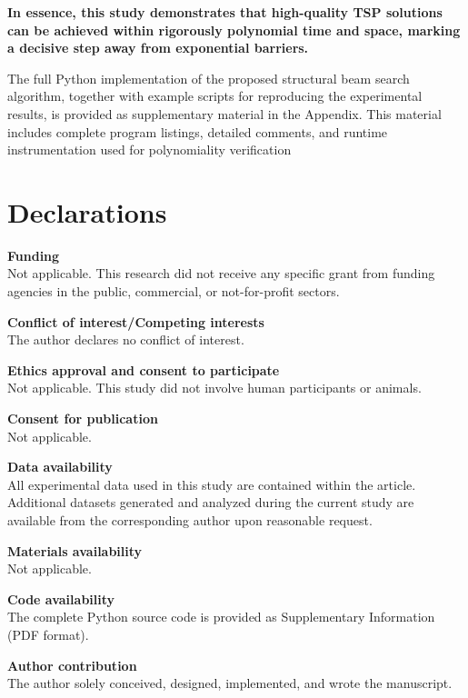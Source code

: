 \documentclass[sn-mathphys]{article}
\theoremstyle{thmstyleone}%
\theoremstyle{thmstyletwo}%
\theoremstyle{thmstylethree}%
\begin{document}
\textbf{In essence, this study demonstrates that high-quality TSP solutions can be achieved within rigorously polynomial time and space, marking a decisive step away from exponential barriers.}

The full Python implementation of the proposed structural beam search algorithm, together with example scripts for reproducing the experimental results, is provided as supplementary material in the Appendix. This material includes complete program listings, detailed comments, and runtime
instrumentation used for polynomiality verification

\section*{Declarations}

\textbf{Funding} \\
Not applicable. This research did not receive any specific grant from funding agencies in the public, commercial, or not-for-profit sectors.

\textbf{Conflict of interest/Competing interests} \\
The author declares no conflict of interest.

\textbf{Ethics approval and consent to participate} \\
Not applicable. This study did not involve human participants or animals.

\textbf{Consent for publication} \\
Not applicable.

\textbf{Data availability} \\
All experimental data used in this study are contained within the article. Additional datasets generated and analyzed during the current study are available from the corresponding author upon reasonable request.

\textbf{Materials availability} \\
Not applicable.

\textbf{Code availability} \\
The complete Python source code is provided as Supplementary Information (PDF format).

\textbf{Author contribution} \\
The author solely conceived, designed, implemented, and wrote the manuscript.
\end{document}

